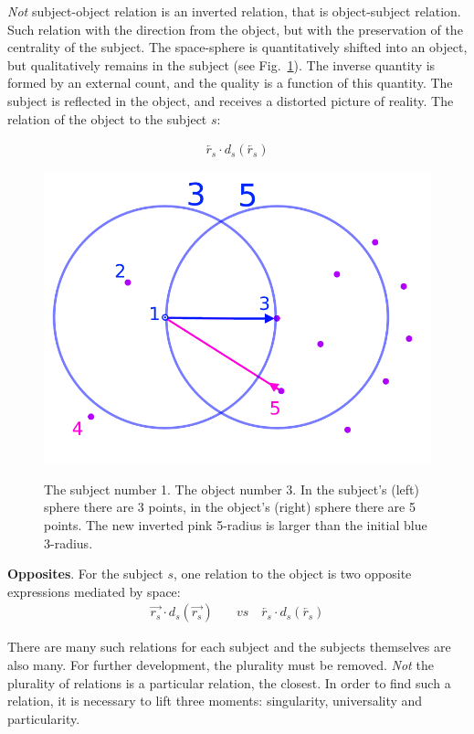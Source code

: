 \documentclass[12pt, a4paper, twocolumn]{article}
\newcommand{\githubPics}{https://raw.githubusercontent.com/artamono1/druhg/master/papers/druhg/}
\begin{document}
\textit{Not} subject-object relation is an inverted relation, that is object-subject relation. Such relation with the direction from the object, but with the preservation of the centrality of the subject. The space-sphere is quantitatively shifted into an object, but qualitatively remains in the subject (see Fig.~\ref{fig:Points}). The inverse quantity is formed by an external count, and the quality is a function of this quantity. The subject is reflected in the object, and receives a distorted picture of reality. The relation of the object to the subject $s$:

\begin{align*}
\overleftarrow{r_{s}} \cdot d_{s}(\overleftarrow{r_{s}})
\end{align*}

\begin{figure}[H]
  \centering
  \href{\githubPics pdn_reverse_vector.png}{\includegraphics[width=0.8\linewidth]{pdn_reverse_vector.png}}
  \caption{The subject number 1. The object number 3. In the subject's (left) sphere there are 3 points, in the object's (right) sphere there are 5 points. The new inverted pink 5-radius is larger than the initial blue 3-radius.}\label{fig:Points}
\end{figure}

\textbf{Opposites}. For the subject $s$, one relation to the object is two opposite expressions mediated by space:
\begin{align*}
  \overrightarrow{r_{s}} \cdot d_{s}(\overrightarrow{r_{s}}) \quad &\textit{vs} \quad  \overleftarrow{r_{s}} \cdot d_{s}(\overleftarrow{r_{s}}) 
  \end{align*}

There are many such relations for each subject and the subjects themselves are also many. For further development, the plurality must be removed. \textit{Not} the plurality of relations is a particular relation, the closest. In order to find such a relation, it is necessary to lift three moments: singularity, universality and particularity. 
\end{document}
